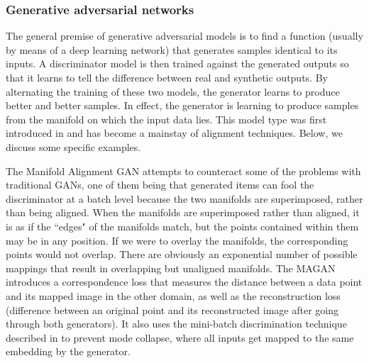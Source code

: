 \subsubsection{Generative adversarial networks}

The general premise of generative adversarial models is to find a function (usually by means of a deep learning network) that generates samples identical to its inputs. A discriminator model is then trained against the generated outputs so that it learns to tell the difference between real and synthetic outputs. By alternating the training of these two models, the generator learns to produce better and better samples. In effect, the generator is learning to produce samples from the manifold on which the input data lies. This model type was first introduced in \cite{GAN} and has become a mainstay of alignment techniques. Below, we discuss some specific examples. 

The Manifold Alignment GAN \cite{magan} attempts to counteract some of the problems with traditional GANs, one of them being that generated items can fool the discriminator at a batch level because the two manifolds are superimposed, rather than being aligned. When the manifolds are superimposed rather than aligned, it is as if the ``edges" of the manifolds match, but the points contained within them may be in any position. If we were to overlay the manifolds, the corresponding points would not overlap. There are obviously an exponential number of possible mappings that result in overlapping but unaligned manifolds. The MAGAN introduces a correspondence loss  that measures the distance between a data point and its mapped image in the other domain, as well as the reconstruction loss (difference between an original point and its reconstructed image after going through both generators). It also uses the mini-batch discrimination technique described in \cite{ImprovedTechniquesTrainingGANS} to prevent mode collapse, where all inputs get mapped to the same embedding by the generator. 

